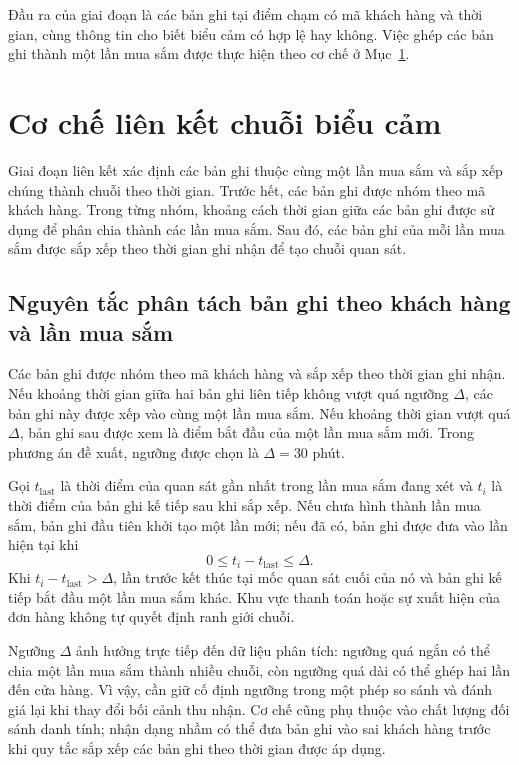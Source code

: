 \documentclass[../LuanVan.tex]{subfiles}
\begin{document}
Đầu ra của giai đoạn là các bản ghi tại điểm chạm có mã khách hàng và thời gian, cùng thông tin cho biết biểu cảm có hợp lệ hay không. Việc ghép các bản ghi thành một lần mua sắm được thực hiện theo cơ chế ở Mục~\ref{section:3.3}.

\section{Cơ chế liên kết chuỗi biểu cảm}
\label{section:3.3}

Giai đoạn liên kết xác định các bản ghi thuộc cùng một lần mua sắm và sắp xếp chúng thành chuỗi theo thời gian. Trước hết, các bản ghi được nhóm theo mã khách hàng. Trong từng nhóm, khoảng cách thời gian giữa các bản ghi được sử dụng để phân chia thành các lần mua sắm. Sau đó, các bản ghi của mỗi lần mua sắm được sắp xếp theo thời gian ghi nhận để tạo chuỗi quan sát.

\subsection{Nguyên tắc phân tách bản ghi theo khách hàng và lần mua sắm}
\label{subsection:3.3.1}

Các bản ghi được nhóm theo mã khách hàng và sắp xếp theo thời gian ghi nhận. Nếu khoảng thời gian giữa hai bản ghi liên tiếp không vượt quá ngưỡng $\Delta$, các bản ghi này được xếp vào cùng một lần mua sắm. Nếu khoảng thời gian vượt quá $\Delta$, bản ghi sau được xem là điểm bắt đầu của một lần mua sắm mới. Trong phương án đề xuất, ngưỡng được chọn là $\Delta=30$ phút.

Gọi $t_{\mathrm{last}}$ là thời điểm của quan sát gần nhất trong lần mua sắm đang xét và $t_i$ là thời điểm của bản ghi kế tiếp sau khi sắp xếp. Nếu chưa hình thành lần mua sắm, bản ghi đầu tiên khởi tạo một lần mới; nếu đã có, bản ghi được đưa vào lần hiện tại khi
\begin{equation}
    0\leq t_i-t_{\mathrm{last}}\leq\Delta.
    \label{eq:ch3_visit_link}
\end{equation}
Khi $t_i-t_{\mathrm{last}}>\Delta$, lần trước kết thúc tại mốc quan sát cuối của nó và bản ghi kế tiếp bắt đầu một lần mua sắm khác. Khu vực thanh toán hoặc sự xuất hiện của đơn hàng không tự quyết định ranh giới chuỗi.

Ngưỡng $\Delta$ ảnh hưởng trực tiếp đến dữ liệu phân tích: ngưỡng quá ngắn có thể chia một lần mua sắm thành nhiều chuỗi, còn ngưỡng quá dài có thể ghép hai lần đến cửa hàng. Vì vậy, cần giữ cố định ngưỡng trong một phép so sánh và đánh giá lại khi thay đổi bối cảnh thu nhận. Cơ chế cũng phụ thuộc vào chất lượng đối sánh danh tính; nhận dạng nhầm có thể đưa bản ghi vào sai khách hàng trước khi quy tắc sắp xếp các bản ghi theo thời gian được áp dụng.
\end{document}
